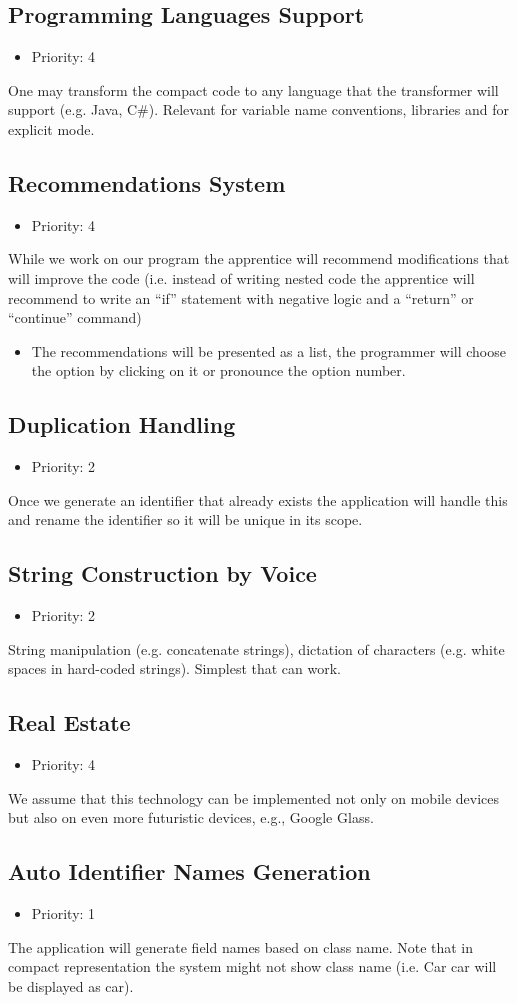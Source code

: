 \subsection{Programming Languages Support}
\begin{itemize}
	\item Priority: 4
\end{itemize}
One may transform the compact code to any language that the transformer will support (e.g. Java, C#). Relevant for variable name conventions, libraries and for explicit mode.
\subsection{Recommendations System}
\begin{itemize}
	\item Priority: 4
\end{itemize}
While we work on our program the apprentice will recommend modifications that will improve the code (i.e. instead of writing nested code the apprentice will recommend to write an “if” statement with negative logic and a “return” or “continue” command)
\begin{itemize}
	\item The recommendations will be presented as a list, the programmer will choose the option by clicking on it or pronounce the option number.
\end{itemize}
\subsection{Duplication Handling}
\begin{itemize}
	\item Priority: 2
\end{itemize}
Once we generate an identifier that already exists the application will handle this and rename the identifier so it will be unique in its scope.
\subsection{String Construction by Voice}
\begin{itemize}
	\item Priority: 2
\end{itemize}
String manipulation (e.g. concatenate strings), dictation of characters (e.g. white spaces in hard-coded strings). Simplest that can work.
\subsection{Real Estate}
\begin{itemize}
	\item Priority: 4
\end{itemize}
We assume that this technology can be implemented not only on mobile devices but also on even more futuristic devices, e.g., Google Glass.
\subsection{Auto Identifier Names Generation}
\begin{itemize}
	\item Priority: 1
\end{itemize}
The application will generate field names based on class name. Note that in compact representation the system might not show class name (i.e. Car car will be displayed as car).